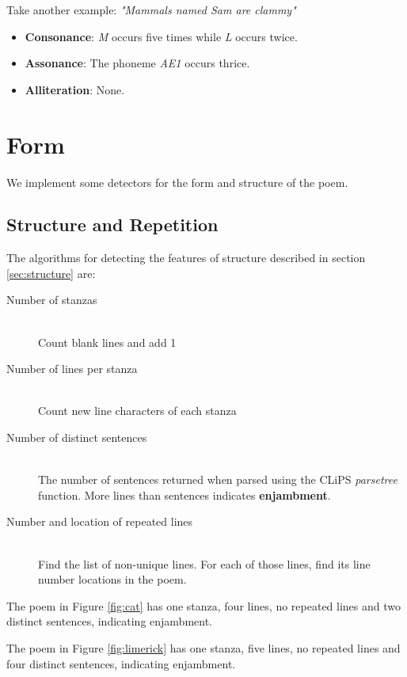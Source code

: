 Take another example: \textit{"Mammals named Sam are clammy"}
\begin{itemize}
\item{\textbf{Consonance}: \textit{M} occurs five times while \textit{L} occurs twice.}
\item{\textbf{Assonance}: The phoneme \textit{AE1} occurs thrice.}
\item{\textbf{Alliteration}: None.}
\end{itemize}

\section{Form}

We implement some detectors for the form and structure of the poem.

\subsection{Structure and Repetition}

The algorithms for detecting the features of structure described in section \ref{sec:structure} are:

\begin{description}
\item[Number of stanzas] \hfill \\
Count blank lines and add 1
\item[Number of lines per stanza] \hfill \\
Count new line characters of each stanza
\item[Number of distinct sentences] \hfill \\
The number of sentences returned when parsed using the CLiPS\cite{de2012pattern} \textit{parsetree} function. 
More lines than sentences indicates \textbf{enjambment}.
\item[Number and location of repeated lines] \hfill \\
Find the list of non-unique lines. For each of those lines, find its line number locations in the poem.

\end{description}

The poem in Figure \ref{fig:cat} has one stanza, four lines, no repeated lines and two distinct sentences, indicating enjambment.

The poem in Figure \ref{fig:limerick} has one stanza, five lines, no repeated lines and four distinct sentences, indicating enjambment.

